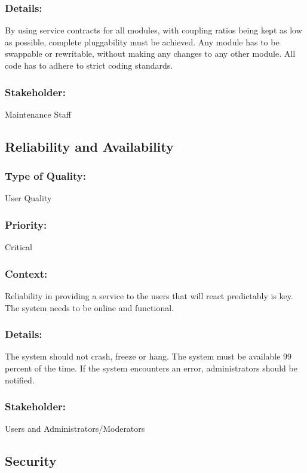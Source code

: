 \documentclass[11pt]{article}
\begin{document}
		\subsubsection{Details:}
			\textbf{}By using service contracts for all modules, with coupling ratios being kept as low as possible, complete pluggability must be achieved. Any module has to be swappable or rewritable, without making any changes to any other module. All code has to adhere to strict coding standards.
		
		\subsubsection{Stakeholder:}
			\textbf{}Maintenance Staff

	\subsection{Reliability and Availability}
		\subsubsection{Type of Quality:}
			\textbf{}User Quality
		
		\subsubsection{Priority:}
			\textbf{} Critical

		\subsubsection{Context:}
			\textbf{}Reliability in providing a service to the users that will react predictably is key. The system needs to be online and functional.
		
		\subsubsection{Details:}
			\textbf{}The system should not crash, freeze or hang. The system must be available 99 percent of the time. If the system encounters an error, administrators should be notified.
		
		\subsubsection{Stakeholder:}
			\textbf{}Users and Administrators/Moderators

	\subsection{Security}
\end{document}
